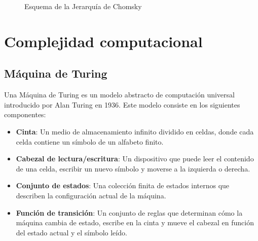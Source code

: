 \documentclass{article}
\begin{document}
\begin{figure}
      \centering
      \caption{Esquema de la Jerarquía de Chomsky}
      \label{fig:ChomskySchema} %
\end{figure}

\section{Complejidad computacional}

\subsection{Máquina de Turing}

Una Máquina de Turing \cite{authomataTheory} es un modelo abstracto de computación universal introducido por Alan Turing en 1936. Este modelo consiste en los siguientes componentes:

\begin{itemize}
      \item \textbf{Cinta}: Un medio de almacenamiento infinito dividido en celdas, donde cada celda contiene un símbolo de un alfabeto finito.
      \item \textbf{Cabezal de lectura/escritura}: Un dispositivo que puede leer el contenido de una celda, escribir un nuevo símbolo y moverse a la izquierda o derecha.
      \item \textbf{Conjunto de estados}: Una colección finita de estados internos que describen la configuración actual de la máquina.
      \item \textbf{Función de transición}: Un conjunto de reglas que determinan cómo la máquina cambia de estado, escribe en la cinta y mueve el cabezal en función del estado actual y el símbolo leído.
\end{itemize}
\end{document}

